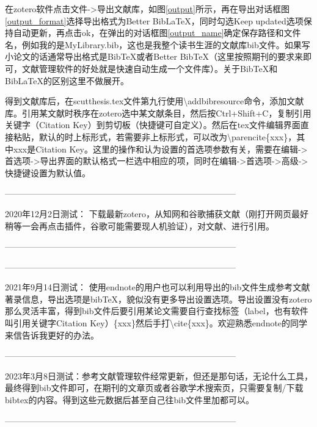 在zotero软件点击文件->导出文献库，如图\ref{output}所示，再在导出对话框图\ref{output_format}选择导出格式为Better BibLaTeX，同时勾选Keep updated选项保持自动更新，再点击ok，在弹出的对话框图\ref{output_name}确定保存路径和文件名，例如我的是MyLibrary.bib，这也是我整个读书生涯的文献库bib文件。如果写小论文的话通常导出格式是BibTeX或者Better BibTeX（这里按照期刊的要求来即可，文献管理软件的好处就是快速自动生成一个文件库）。关于BibTeX和BibLaTeX的区别这里不做展开。

得到文献库后，在scutthesis.tex文件第九行使用\textbackslash{}addbibresource命令，添加文献库。引用某文献时秩序在zotero选中某文献条目，然后按Ctrl+Shift+C，复制引用关键字（Citation Key）到剪切板（快捷键可自定义）。然后在tex文件编辑界面直接粘贴，默认的时上标形式，若需要非上标形式，可以改为\textbackslash{}parencite\{xxx\}，其中xxx是Citation Key。这里的操作和认为设置的首选项参数有关，需要在编辑->首选项->导出界面的默认格式一栏选中相应的项，同时在编辑->首选项->高级->快捷键设置为默认值。

---------------------------------------------------------------------------------

2020年12月2日测试：
下载最新zotero，从知网和谷歌捕获文献（刚打开网页最好稍等一会再点击插件，谷歌可能需要现人机验证），对文献\cite{Renduchintala_2019}、\parencite{milz2020design}进行引用。

---------------------------------------------------------------------------------

---------------------------------------------------------------------------------

2021年9月14日测试：
使用endnote的用户也可以利用导出的bib文件生成参考文献著录信息，导出选项是bibTeX，貌似没有更多导出设置选项。导出设置没有zotero那么灵活丰富，得到bib文件后要引用某论文需要自行查找标签（label，也有软件叫引用关键字Citation Key）\{xxx\}然后手打\textbackslash{}cite\{xxx\}。欢迎熟悉endnote的同学来信告诉我更好的办法。

---------------------------------------------------------------------------------

2023年3月8日测试：参考文献管理软件经常更新，但还是那句话，无论什么工具，最终得到bib文件即可，在期刊的文章页或者谷歌学术搜索页，只需要复制/下载bibtex的内容。得到这些元数据后甚至自己往bib文件里加都可以。

---------------------------------------------------------------------------------

